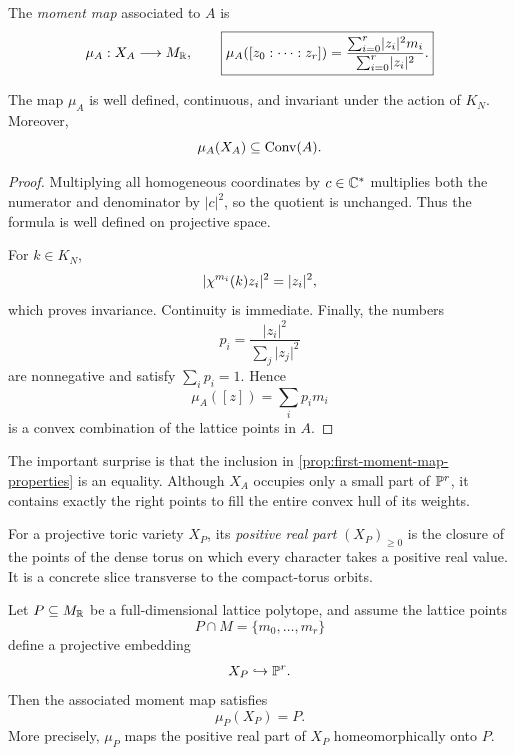 \begin{definition}
\label{def:projective-moment-map}
The \emph{moment map} associated to \(A\) is
\[
\mu_A:X_A\longrightarrow M_{\mathbb{R}},
\qquad
\boxed{
\mu_A([z_0:\cdots:z_r])
=
\frac{\sum_{i=0}^r\lvert z_i\rvert^2m_i}
     {\sum_{i=0}^r\lvert z_i\rvert^2}.}
\]
\end{definition}

\begin{proposition}
\label{prop:first-moment-map-properties}
The map \(\mu_A\) is well defined, continuous, and invariant under the
action of \(K_N\). Moreover,
\[
\mu_A(X_A)\subseteq\operatorname{Conv}(A).
\]
\end{proposition}

\begin{proof}
Multiplying all homogeneous coordinates by \(c\in\mathbb{C}^*\) multiplies
both the numerator and denominator by \(\lvert c\rvert^2\), so the
quotient is unchanged. Thus the formula is well defined on projective
space.

For \(k\in K_N\),
\[
\lvert\chi^{m_i}(k)z_i\rvert^2=\lvert z_i\rvert^2,
\]
which proves invariance. Continuity is immediate. Finally, the numbers
\[
p_i=\frac{\lvert z_i\rvert^2}{\sum_j\lvert z_j\rvert^2}
\]
are nonnegative and satisfy \(\sum_i p_i=1\). Hence
\[
\mu_A([z])=\sum_i p_i m_i
\]
is a convex combination of the lattice points in \(A\).
\end{proof}

The important surprise is that the inclusion in
\cref{prop:first-moment-map-properties} is an equality. Although
\(X_A\) occupies only a small part of \(\mathbb{P}^r\), it contains exactly
the right points to fill the entire convex hull of its weights.

For a projective toric variety \(X_P\), its \emph{positive real part}
\((X_P)_{\geq0}\) is the closure of the points of the dense torus on
which every character takes a positive real value. It is a concrete
slice transverse to the compact-torus orbits.

\begin{theorem}
\label{thm:moment-image-is-polytope}
Let \(P\subseteq M_{\mathbb{R}}\) be a full-dimensional lattice polytope, and
assume the lattice points
\[
P\cap M=\{m_0,\dots,m_r\}
\]
define a projective embedding
\[
X_P\hookrightarrow\mathbb{P}^r.
\]
Then the associated moment map satisfies
\[
\boxed{\mu_P(X_P)=P.}
\]
More precisely, \(\mu_P\) maps the positive real part of \(X_P\)
homeomorphically onto \(P\).
\end{theorem}

